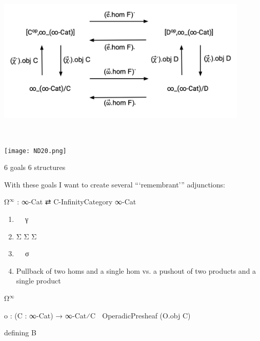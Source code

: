 \documentclass{book}
\theoremstyle{definition}
\begin{document}
\begin{center}
\includegraphics[width=0.9\textwidth]{ND10.png} \\
\end{center}

\ \\

\begin{center}
\texttt{[image: ND20.png]} \\
\end{center}


\newpage


6 goals
6 structures

With these goals I want to create several ```remembrant''' adjunctions:

\begin{center}
Ω${}^{∞}$ : ∞-Cat ⇄ C-InfinityCategory ∞-Cat
\end{center}


\begin{enumerate}
\item γ⃗ γ⃡ γ
\item Σ⃗ Σ⃡ Σ
\item σ⃗ σ⃡ σ
\item Pullback of two homs and a single hom vs. a pushout of two products and a single product
\end{enumerate}


 

Ω${}^{∞}$ 

\begin{center}
o⃗ : (C : ∞-Cat) → ∞-Cat⁄C ⭢ OperadicPresheaf (O⃗.obj C)
\end{center}

defining B
\end{document}
